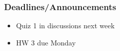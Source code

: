 
\begin{frame}
    \frametitle{Deadlines/Announcements}
\begin{itemize}
            \item Quiz 1 in discussions next week
            \item HW 3 due Monday
        \end{itemize}
\end{frame}
